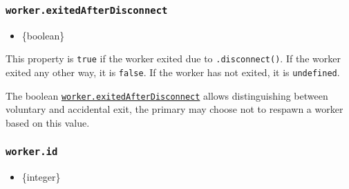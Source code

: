\subsubsection{\texorpdfstring{\texttt{worker.exitedAfterDisconnect}}{worker.exitedAfterDisconnect}}\label{worker.exitedafterdisconnect}

\begin{itemize}
\tightlist
\item
  \{boolean\}
\end{itemize}

This property is \texttt{true} if the worker exited due to
\texttt{.disconnect()}. If the worker exited any other way, it is
\texttt{false}. If the worker has not exited, it is \texttt{undefined}.

The boolean
\hyperref[workerexitedafterdisconnect]{\texttt{worker.exitedAfterDisconnect}}
allows distinguishing between voluntary and accidental exit, the primary
may choose not to respawn a worker based on this value.

\begin{Shaded}
\begin{Highlighting}[]
\NormalTok{(}\OperatorTok{,}\OperatorTok{,}\OperatorTok{,}\KeywordTok{=\textgreater{}}\NormalTok{ \{}
   \OperatorTok{===} \NormalTok{) \{}
    \NormalTok{(}\NormalTok{)}\OperatorTok{;}
\NormalTok{  \}}
\NormalTok{\})}\OperatorTok{;}

\NormalTok{()}\OperatorTok{;}
\end{Highlighting}
\end{Shaded}

\subsubsection{\texorpdfstring{\texttt{worker.id}}{worker.id}}\label{worker.id}

\begin{itemize}
\tightlist
\item
  \{integer\}
\end{itemize}

